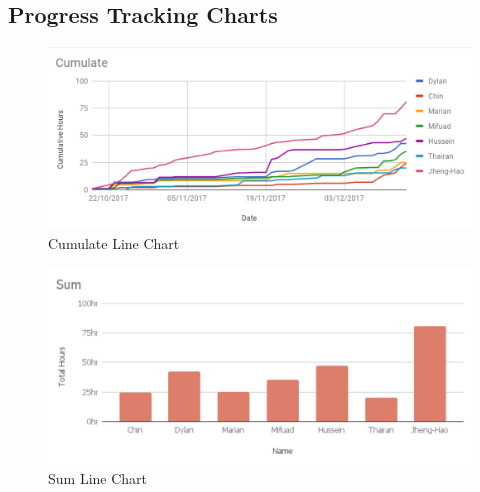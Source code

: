 \documentclass[12pt,a4paper]{article}
\begin{document}
\begin{appendices}
      \begin{table}[H]
        \centering
        \caption{Progress Tracking Form Label} 
      \end{table} 

    \section{Progress Tracking Charts}
      \label{appendix:progess-tracking-charts}
      \begin{figure}[H]
        \centering
        \includegraphics[width=1\textwidth]{assets/12-9-4-progress-tracking-chart-cumulate.jpg}
        \caption{Cumulate Line Chart}
        \label{fig:Cumulate Line Chart}
      \end{figure}

      \begin{figure}[H]
        \centering
        \includegraphics[width=1\textwidth]{assets/12-9-4-progress-tracking-chart-sum.jpg}
        \caption{Sum Line Chart}
        \label{fig:Sum Line Chart}
      \end{figure}


\end{appendices}
\end{document}
